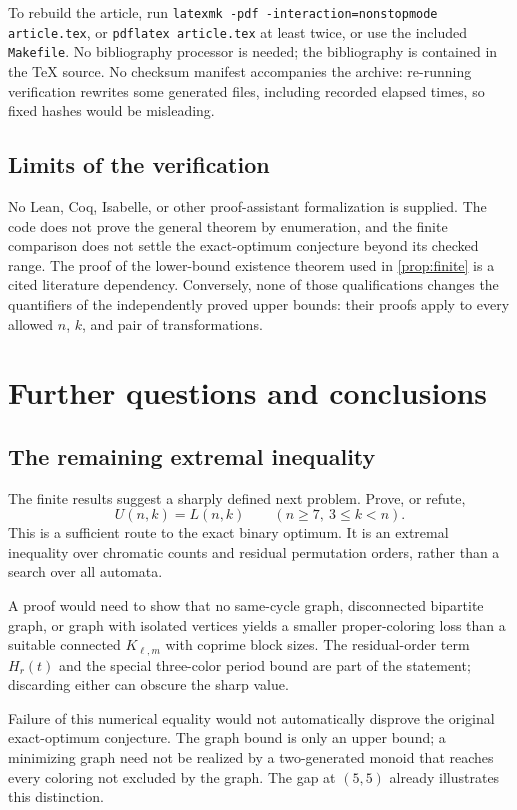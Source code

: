 \documentclass[11pt,a4paper]{article}
\numberwithin{equation}{section}
\theoremstyle{definition}
\theoremstyle{remark}
\begin{document}
To rebuild the article, run
\texttt{latexmk -pdf -interaction=nonstopmode article.tex}, or
\texttt{pdflatex article.tex} at least twice, or use the included
\texttt{Makefile}. No bibliography processor is needed; the bibliography is
contained in the TeX source. No checksum manifest accompanies the archive:
re-running verification rewrites some generated files, including recorded
elapsed times, so fixed hashes would be misleading.

\subsection{Limits of the verification}

No Lean, Coq, Isabelle, or other proof-assistant formalization is supplied.
The code does not prove the general theorem by enumeration, and the finite
comparison does not settle the exact-optimum conjecture beyond its checked
range. The proof of the lower-bound existence theorem used in
\cref{prop:finite} is a cited literature dependency. Conversely, none of those
qualifications changes the quantifiers of the independently proved upper
bounds: their proofs apply to every allowed $n$, $k$, and pair of
transformations.

\section{Further questions and conclusions}\label{sec:conclusion}

\subsection{The remaining extremal inequality}

The finite results suggest a sharply defined next problem. Prove, or refute,
\[
 U(n,k)=L(n,k)\qquad(n\ge7,\ 3\le k<n).
\]
This is a sufficient route to the exact binary optimum. It is an extremal
inequality over chromatic counts and residual permutation orders, rather
than a search over all automata.

A proof would need to show that no same-cycle graph, disconnected bipartite
graph, or graph with isolated vertices yields a smaller proper-coloring
loss than a suitable connected $K_{\ell,m}$ with coprime block sizes.
The residual-order term $H_r(t)$ and the special three-color period bound are
part of the statement; discarding either can obscure the sharp value.

Failure of this numerical equality would not automatically disprove the
original exact-optimum conjecture. The graph bound is only an upper bound;
a minimizing graph need not be realized by a two-generated monoid that
reaches every coloring not excluded by the graph. The gap at $(5,5)$ already
illustrates this distinction.
\end{document}
